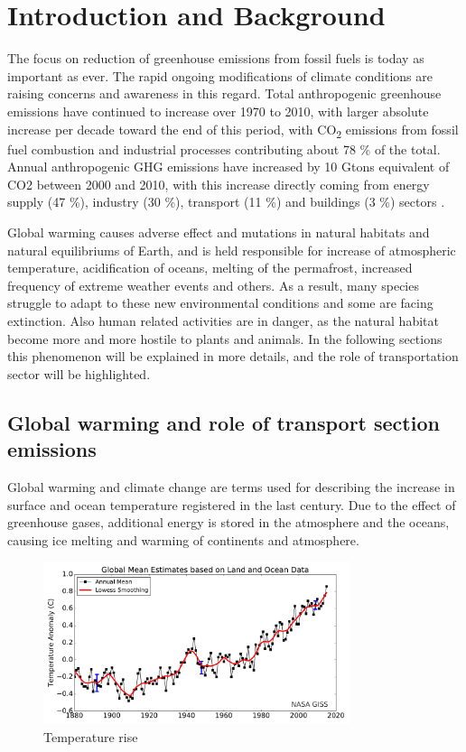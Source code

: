 \chapter{Introduction and Background}

The focus on reduction of greenhouse emissions from fossil fuels is today as important as ever. The rapid ongoing modifications of climate conditions are raising concerns and awareness in this regard. Total anthropogenic greenhouse emissions have continued to increase over 1970 to 2010, with larger absolute  increase per decade toward the end of this period, with CO\textsubscript{2} emissions from fossil fuel combustion and industrial processes contributing about 78 \% of the total. Annual anthropogenic GHG emissions have increased by 10 Gtons equivalent of CO2 between 2000 and 2010, with this increase directly coming from energy supply (47 \%), industry (30 \%), transport (11 \%) and buildings (3 \%) sectors \cite{IPCC2014}.

Global warming causes adverse effect and mutations in natural habitats and natural equilibriums of Earth, and is held responsible for increase of atmospheric temperature, acidification of oceans, melting of the permafrost, increased frequency of extreme weather events and others. As a result, many species struggle to adapt to these new environmental conditions and some are facing extinction. Also human related activities are in danger, as the natural habitat become more and more hostile to plants and animals. In the following sections this phenomenon will be explained in more details, and  the role of transportation sector will be highlighted.

\section{Global warming and role of transport section emissions} \label{sec:global_warming}

Global warming and climate change are terms used for describing the increase in surface and ocean temperature registered in the last century. Due to the effect of greenhouse gases, additional energy is stored in the atmosphere and the oceans, causing ice melting and warming of continents and atmosphere. 

\begin{figure}[h]
  \centering
  \includegraphics[width=0.8\textwidth]{figures/introduction/temp_rise.pdf}
  \caption{Temperature rise \cite{GISS2016}}
  \label{antropogenic_ghg_emissions}
\end{figure}

